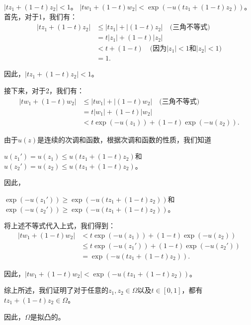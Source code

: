 \documentclass[12pt, a4paper, oneside]{ctexart}
\begin{document}
\begin{spacing}{2.0}
$\displaystyle |tz_1 + (1-t)z_2| < 1$。
$\displaystyle |tw_1 + (1-t)w_2| < \exp(-u(tz_1 + (1-t)z_2))$。
首先，对于1，我们有：
\begin{align*}
|tz_1 + (1-t)z_2| & \leq |tz_1| + |(1-t)z_2| \quad \text{(三角不等式)} \\
& = t|z_1| + (1-t)|z_2| \\
& < t + (1-t) \quad \text{(因为$|z_1| < 1$和$|z_2| < 1$)} \\
& = 1.
\end{align*}

因此，$|tz_1 + (1-t)z_2| < 1$。

接下来，对于2，我们有：
\begin{align*}
|tw_1 + (1-t)w_2| & \leq |tw_1| + |(1-t)w_2| \quad \text{(三角不等式)} \\
& = t|w_1| + (1-t)|w_2| \\
& < t\exp(-u(z_1)) + (1-t)\exp(-u(z_2)).
\end{align*}

由于$u(z)$是连续的次调和函数，根据次调和函数的性质，我们知道
\begin{center}
    $\displaystyle u(z_1') = u(z_1) \leq u(tz_1 + (1-t)z_2)$和$\displaystyle u(z_2') = u(z_2) \leq u(tz_1 + (1-t)z_2)$。
\end{center}


因此，
\begin{center}
    $\displaystyle \exp(-u(z_1')) \geq \exp(-u(tz_1 + (1-t)z_2))$和$\displaystyle \exp(-u(z_2')) \geq \exp(-u(tz_1 + (1-t)z_2))$。

\end{center}



将上述不等式代入上式，我们得到：
\begin{align*}
|tw_1 + (1-t)w_2| & < t\exp(-u(z_1)) + (1-t)\exp(-u(z_2)) \\
& \leq t\exp(-u(z_1')) + (1-t)\exp(-u(z_2')) \\
& = \exp(-u(tz_1 + (1-t)z_2)).
\end{align*}

因此，$|tw_1 + (1-t)w_2| < \exp(-u(tz_1 + (1-t)z_2))$。

综上所述，我们证明了对于任意的$z_1, z_2 \in \Omega$以及$t \in [0,1]$，都有$tz_1 + (1-t)z_2 \in \Omega$。

因此，$\Omega$是拟凸的。







\end{spacing}{}
\end{document}
